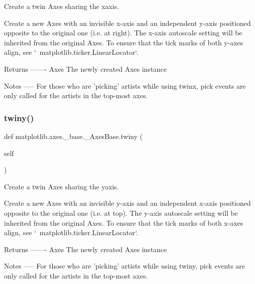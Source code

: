 \begin{DoxyVerb}Create a twin Axes sharing the xaxis.

Create a new Axes with an invisible x-axis and an independent
y-axis positioned opposite to the original one (i.e. at right). The
x-axis autoscale setting will be inherited from the original
Axes.  To ensure that the tick marks of both y-axes align, see
`~matplotlib.ticker.LinearLocator`.

Returns
-------
Axes
    The newly created Axes instance

Notes
-----
For those who are 'picking' artists while using twinx, pick
events are only called for the artists in the top-most axes.
\end{DoxyVerb}
 \mbox{\label{classmatplotlib_1_1axes_1_1__base_1_1__AxesBase_acc6747800d47cae82e9f179862b90da4}} 
\subsubsection{\texorpdfstring{twiny()}{twiny()}}
{\footnotesize\ttfamily def matplotlib.\+axes.\+\_\+base.\+\_\+\+Axes\+Base.\+twiny (\begin{DoxyParamCaption}\item[{}]{self }\end{DoxyParamCaption})}

\begin{DoxyVerb}Create a twin Axes sharing the yaxis.

Create a new Axes with an invisible y-axis and an independent
x-axis positioned opposite to the original one (i.e. at top). The
y-axis autoscale setting will be inherited from the original Axes.
To ensure that the tick marks of both x-axes align, see
`~matplotlib.ticker.LinearLocator`.

Returns
-------
Axes
    The newly created Axes instance

Notes
-----
For those who are 'picking' artists while using twiny, pick
events are only called for the artists in the top-most axes.
\end{DoxyVerb}
 \mbox{\label{classmatplotlib_1_1axes_1_1__base_1_1__AxesBase_a9d5aa2b3144e3b5b59c63b09e3130a60}} 
